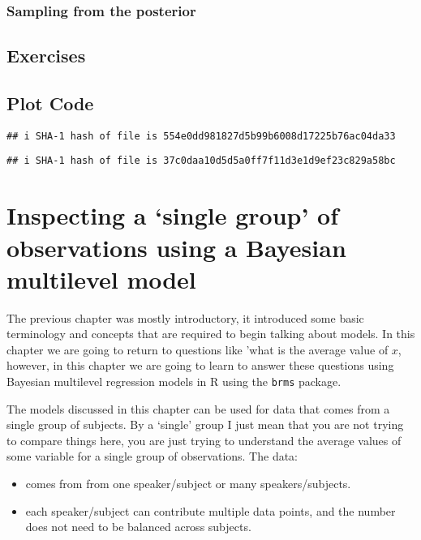 \documentclass[
]{book}
\providecommand{\tightlist}{%
  \setlength{\itemsep}{0pt}\setlength{\parskip}{0pt}}
\begin{document}
\hypertarget{sampling-from-the-posterior}{%
\subsection{Sampling from the posterior}\label{sampling-from-the-posterior}}

\hypertarget{exercises}{%
\section{Exercises}\label{exercises}}

\hypertarget{plot-code}{%
\section{Plot Code}\label{plot-code}}

\begin{verbatim}
## i SHA-1 hash of file is 554e0dd981827d5b99b6008d17225b76ac04da33
\end{verbatim}

\begin{verbatim}
## i SHA-1 hash of file is 37c0daa10d5d5a0ff7f11d3e1d9ef23c829a58bc
\end{verbatim}

\hypertarget{inspecting-a-single-group-of-observations-using-a-bayesian-multilevel-model}{%
\chapter{Inspecting a `single group' of observations using a Bayesian multilevel model}\label{inspecting-a-single-group-of-observations-using-a-bayesian-multilevel-model}}

The previous chapter was mostly introductory, it introduced some basic terminology and concepts that are required to begin talking about models. In this chapter we are going to return to questions like 'what is the average value of \(x\), however, in this chapter we are going to learn to answer these questions using Bayesian multilevel regression models in R using the \texttt{brms} package.

The models discussed in this chapter can be used for data that comes from a single group of subjects. By a `single' group I just mean that you are not trying to compare things here, you are just trying to understand the average values of some variable for a single group of observations. The data:

\begin{itemize}
\tightlist
\item
  comes from from one speaker/subject or many speakers/subjects.
\item
  each speaker/subject can contribute multiple data points, and the number does not need to be balanced across subjects.
\end{itemize}
\end{document}
